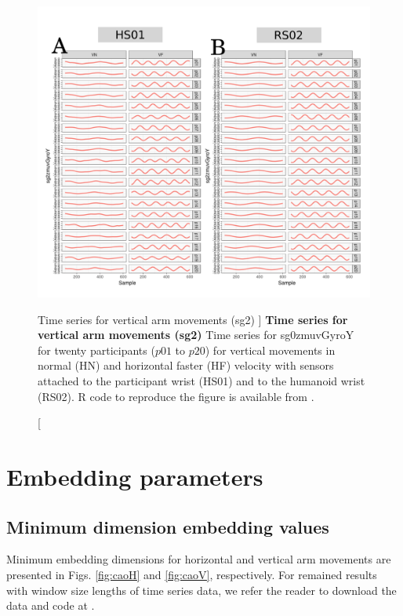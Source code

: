 \begin{figure}
\centering
\includegraphics[width=1.0\textwidth]{aV-sg2}
    	\caption
	[Time series for vertical arm movements (sg2) ]{
	{\bf Time series for vertical arm movements (sg2)}
		Time series for sg0zmuvGyroY for twenty participants 
		($p01$ to  $p20$) 
		for vertical movements in normal (HN) and horizontal faster (HF) 
		velocity with sensors attached to the participant wrist (HS01)
		and to the humanoid wrist (RS02).
	R code to reproduce the figure is available from \cite{xochicale2018}.
        }
    \label{fig:aV-sg2}
\end{figure}










\newpage
\section{Embedding parameters} \label{appendix:e:ep}
\subsection{Minimum dimension embedding values}

Minimum embedding dimensions for horizontal and vertical arm movements
are presented in Figs.  \ref{fig:caoH} and \ref{fig:caoV}, respectively.
For remained  results with window size lengths of time series data, we refer
the reader to download the data and code at \cite{xochicale2018}.


